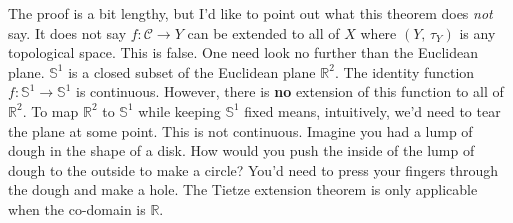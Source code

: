 \documentclass{article}
\theoremstyle{plain}
\begin{document}
        The proof is a bit lengthy, but I'd like to point out what this theorem
        does \textit{not} say. It does not say
        $f:\mathcal{C}\rightarrow{Y}$ can be extended to all of $X$ where
        $(Y,\,\tau_{Y})$ is any topological space. This is false. One need look
        no further than the Euclidean plane.
        $\mathbb{S}^{1}$ is a closed subset of the Euclidean plane
        $\mathbb{R}^{2}$. The identity function
        $f:\mathbb{S}^{1}\rightarrow\mathbb{S}^{1}$ is continuous. However,
        there is \textbf{no} extension of this function to all of
        $\mathbb{R}^{2}$. To map $\mathbb{R}^{2}$ to $\mathbb{S}^{1}$ while
        keeping $\mathbb{S}^{1}$ fixed means, intuitively, we'd need to tear the
        plane at some point. This is not continuous. Imagine you had a lump of
        dough in the shape of a disk. How would you push the inside
        of the lump of dough to the outside to make a circle? You'd need to
        press your fingers through the dough and make a hole.
        The Tietze extension theorem is only applicable when the co-domain is
        $\mathbb{R}$.
\end{document}
